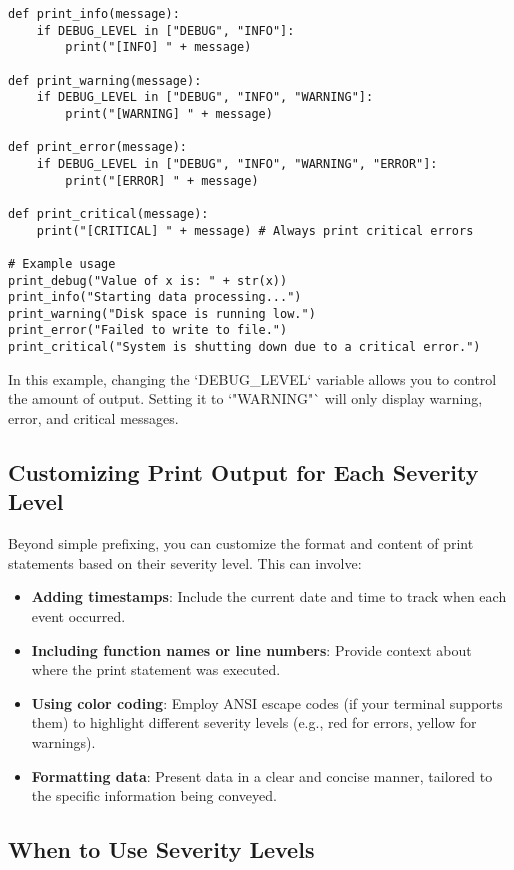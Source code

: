 \documentclass{article}
\begin{document}
{{{\begin{verbatim}
def print_info(message):
    if DEBUG_LEVEL in ["DEBUG", "INFO"]:
        print("[INFO] " + message)

def print_warning(message):
    if DEBUG_LEVEL in ["DEBUG", "INFO", "WARNING"]:
        print("[WARNING] " + message)

def print_error(message):
    if DEBUG_LEVEL in ["DEBUG", "INFO", "WARNING", "ERROR"]:
        print("[ERROR] " + message)

def print_critical(message):
    print("[CRITICAL] " + message) # Always print critical errors

# Example usage
print_debug("Value of x is: " + str(x))
print_info("Starting data processing...")
print_warning("Disk space is running low.")
print_error("Failed to write to file.")
print_critical("System is shutting down due to a critical error.")
\end{verbatim}

In this example, changing the `DEBUG_LEVEL` variable allows you to control the amount of output.  Setting it to `"WARNING"` will only display warning, error, and critical messages.

\subsection*{Customizing Print Output for Each Severity Level}

Beyond simple prefixing, you can customize the format and content of print statements based on their severity level.  This can involve:

\begin{itemize}
    \item \textbf{Adding timestamps}:  Include the current date and time to track when each event occurred.
    \item \textbf{Including function names or line numbers}:  Provide context about where the print statement was executed.
    \item \textbf{Using color coding}:  Employ ANSI escape codes (if your terminal supports them) to highlight different severity levels (e.g., red for errors, yellow for warnings).
    \item \textbf{Formatting data}:  Present data in a clear and concise manner, tailored to the specific information being conveyed.
\end{itemize}

\subsection*{When to Use Severity Levels}

}}}
\end{document}
